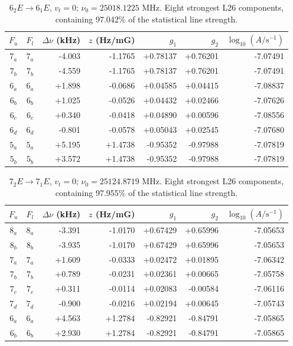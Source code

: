 \begin{table}[!htbp]
\centering\small\renewcommand{\arraystretch}{1.1}\setlength{\tabcolsep}{5pt}
\caption{$6_{2} E\rightarrow 6_{1} E$, $v_t=0$; $\nu_0=25018.1225$ MHz. Eight strongest L26 components, containing 97.042\% of the statistical line strength.}
\label{tab:sm-zeeman-25p018}
\begin{tabular}{ccrrrrr}
\hline\hline
$F_u$ & $F_l$ & $\Delta\nu$ (kHz) & $z$ (Hz/mG) & $g_1$ & $g_2$ & $\log_{10}(A/\mathrm{s}^{-1})$ \\
\hline
$7_{a}$ & $7_{a}$ & -4.003 & -1.1765 & +0.78137 & +0.76201 & -7.07491\\
$7_{b}$ & $7_{b}$ & -4.559 & -1.1765 & +0.78137 & +0.76201 & -7.07491\\
$6_{a}$ & $6_{a}$ & +1.898 & -0.0686 & +0.04585 & +0.04415 & -7.08837\\
$6_{b}$ & $6_{b}$ & +1.025 & -0.0526 & +0.04432 & +0.02466 & -7.07626\\
$6_{c}$ & $6_{c}$ & +0.340 & -0.0418 & +0.04890 & +0.00596 & -7.08556\\
$6_{d}$ & $6_{d}$ & -0.801 & -0.0578 & +0.05043 & +0.02545 & -7.07680\\
$5_{a}$ & $5_{a}$ & +5.195 & +1.4738 & -0.95352 & -0.97988 & -7.07819\\
$5_{b}$ & $5_{b}$ & +3.572 & +1.4738 & -0.95352 & -0.97988 & -7.07819\\
\hline\end{tabular}
\end{table}

\begin{table}[!htbp]
\centering\small\renewcommand{\arraystretch}{1.1}\setlength{\tabcolsep}{5pt}
\caption{$7_{2} E\rightarrow 7_{1} E$, $v_t=0$; $\nu_0=25124.8719$ MHz. Eight strongest L26 components, containing 97.955\% of the statistical line strength.}
\label{tab:sm-zeeman-25p125}
\begin{tabular}{ccrrrrr}
\hline\hline
$F_u$ & $F_l$ & $\Delta\nu$ (kHz) & $z$ (Hz/mG) & $g_1$ & $g_2$ & $\log_{10}(A/\mathrm{s}^{-1})$ \\
\hline
$8_{a}$ & $8_{a}$ & -3.391 & -1.0170 & +0.67429 & +0.65996 & -7.05653\\
$8_{b}$ & $8_{b}$ & -3.935 & -1.0170 & +0.67429 & +0.65996 & -7.05653\\
$7_{a}$ & $7_{a}$ & +1.609 & -0.0333 & +0.02472 & +0.01895 & -7.06342\\
$7_{b}$ & $7_{b}$ & +0.789 & -0.0231 & +0.02361 & +0.00665 & -7.05758\\
$7_{c}$ & $7_{c}$ & +0.311 & -0.0114 & +0.02083 & -0.00584 & -7.06116\\
$7_{d}$ & $7_{d}$ & -0.900 & -0.0216 & +0.02194 & +0.00645 & -7.05743\\
$6_{a}$ & $6_{a}$ & +4.563 & +1.2784 & -0.82921 & -0.84791 & -7.05865\\
$6_{b}$ & $6_{b}$ & +2.930 & +1.2784 & -0.82921 & -0.84791 & -7.05865\\
\hline\end{tabular}
\end{table}

